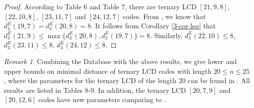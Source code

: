 \documentclass[12pt,twoside]{article}
\theoremstyle{plain}
\theoremstyle{definition}
\theoremstyle{remark}
\newtheorem{remark}[theorem]{Remark}
\begin{document}
\begin{proof}
According to Table 6 and Table 7, there are ternary LCD $[21,9,8]$, $[22,10,8]$, $[23,11,7]$ and $[24,12,7]$ codes. From \cite{ter-11-19}, we know that $d_3^E(19,7)=d_3^E(20,8)=8$.
It follows from Corollary \ref{3-cor-leq} that $d_3^E(21,9)\leq \max\{d_3^E(20,8),d_3^E(19,7)\}=8$.
Similarly, $d_3^E(22,10)\leq 8$, $d_3^E(23,11)\leq 8$, $d_3^E(24,12)\leq 8$.
\end{proof}

\begin{remark}
Combining the Database \cite{codetables} with the above results, we give lower and upper bounds on minimal distance of ternary LCD codes with length $20\leq n\leq 25$, where the parameters for the ternary LCD of the length 20 can be found in \cite{ter-11-19}. All results are listed in Tables 8-9. In addition, the ternary LCD $[20,7,9]$ and $[20,12,6]$ codes have new parameters comparing to \cite{ter-11-19}.
\end{remark}
\end{document}
